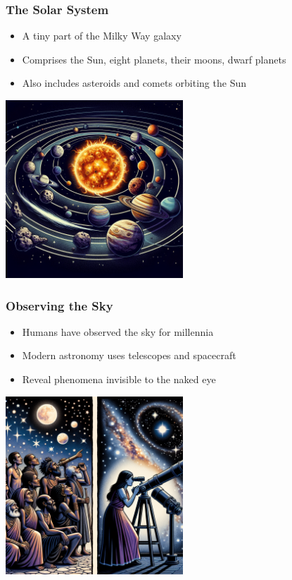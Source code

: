 \documentclass{beamer}
\begin{document}
\begin{frame}
    \frametitle{The Solar System}
    \begin{itemize}
        \item A tiny part of the Milky Way galaxy
        \item Comprises the Sun, eight planets, their moons, dwarf planets
        \item Also includes asteroids and comets orbiting the Sun
    \end{itemize}
    \centering
    \includegraphics[width=0.5\textwidth]{./images/solar_system.png}
\end{frame}

\begin{frame}
    \frametitle{Observing the Sky}
    \begin{itemize}
        \item Humans have observed the sky for millennia
        \item Modern astronomy uses telescopes and spacecraft
        \item Reveal phenomena invisible to the naked eye
    \end{itemize}
    \centering
    \includegraphics[width=0.5\textwidth]{./images/observing_sky.png}
\end{frame}
\end{document}

